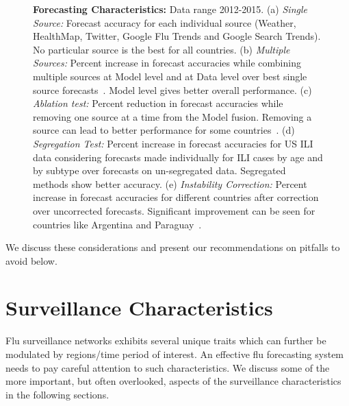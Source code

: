 \documentclass[10pt,letterpaper]{article}
\newcommand{\narenc}[1]{{\color{black}\textrm{#1}}}
\begin{document}
\begin{figure}[H]
  \centering

  \caption{\textbf{Forecasting Characteristics:} Data range 2012-2015.
  (a) \textit{Single Source:}
  Forecast accuracy for each individual source (Weather, HealthMap, 
  Twitter, Google Flu Trends and Google Search Trends). No particular 
  source is the best for all countries.
  (b) \textit{Multiple Sources:}
  Percent increase in forecast accuracies while combining multiple sources at 
  Model level and at Data level over best single source forecasts~\cite{chakraborty2014forecasting}.
  Model level gives better overall performance.
  (c) \textit{Ablation test:}
  Percent reduction in forecast accuracies while 
  removing one source at a time from the Model fusion. 
  Removing a source can lead to better performance for some
  countries~\cite{chakraborty2014forecasting}.
  (d) \textit{Segregation Test:}
  Percent increase in forecast accuracies for US ILI data considering forecasts made individually 
  for ILI cases by age and by subtype  over forecasts on un-segregated data.
  Segregated methods show better accuracy.
  (e) \textit{Instability Correction:}
  Percent increase in forecast accuracies for different countries after
  correction over uncorrected forecasts.  Significant improvement can be seen
  for countries like Argentina and Paraguay~\cite{chakraborty2014forecasting}.
  \label{fig2}
  }
\end{figure}

\narenc{We discuss these considerations
and present our recommendations on pitfalls to avoid below.}

\section*{Surveillance Characteristics}
Flu surveillance networks exhibits several unique traits which can further be
modulated by regions/time period of interest. An effective flu forecasting 
system needs to pay careful attention to such characteristics. We discuss some
of the more important, but often overlooked, aspects of the surveillance
characteristics in the following sections.
\end{document}
